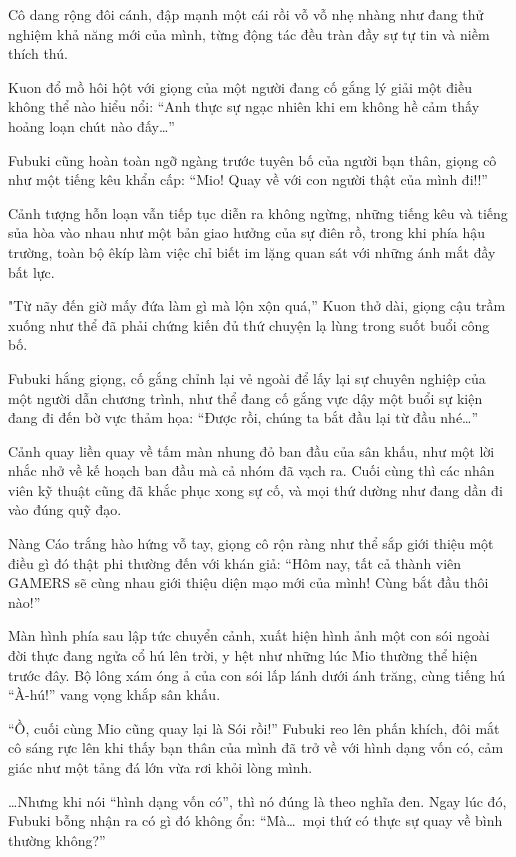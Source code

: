 \documentclass[../main.tex]{subfiles}
\begin{document}
Cô dang rộng đôi cánh, đập mạnh một cái rồi vỗ vỗ nhẹ nhàng như đang thử nghiệm khả năng mới của mình, từng động tác đều tràn đầy sự tự tin và niềm thích thú.

Kuon đổ mồ hôi hột với giọng của một người đang cố gắng lý giải một điều không thể nào hiểu nổi: ``Anh thực sự ngạc nhiên khi em không hề cảm thấy hoảng loạn chút nào đấy\dots''

Fubuki cũng hoàn toàn ngỡ ngàng trước tuyên bố của người bạn thân, giọng cô như một tiếng kêu khẩn cấp: ``Mio! Quay về với con người thật của mình đi!!''

Cảnh tượng hỗn loạn vẫn tiếp tục diễn ra không ngừng, những tiếng kêu và tiếng sủa hòa vào nhau như một bản giao hưởng của sự điên rồ, trong khi phía hậu trường, toàn bộ êkíp làm việc chỉ biết im lặng quan sát với những ánh mắt đầy bất lực.

\ct

"Từ nãy đến giờ mấy đứa làm gì mà lộn xộn quá,'' Kuon thở dài, giọng cậu trầm xuống như thể đã phải chứng kiến đủ thứ chuyện lạ lùng trong suốt buổi công bố.

Fubuki hắng giọng, cố gắng chỉnh lại vẻ ngoài để lấy lại sự chuyên nghiệp của một người dẫn chương trình, như thể đang cố gắng vực dậy một buổi sự kiện đang đi đến bờ vực thảm họa: ``Được rồi, chúng ta bắt đầu lại từ đầu nhé\dots''

Cảnh quay liền quay về tấm màn nhung đỏ ban đầu của sân khấu, như một lời nhắc nhở về kế hoạch ban đầu mà cả nhóm đã vạch ra. Cuối cùng thì các nhân viên kỹ thuật cũng đã khắc phục xong sự cố, và mọi thứ dường như đang dần đi vào đúng quỹ đạo.


Nàng Cáo trắng hào hứng vỗ tay, giọng cô rộn ràng như thể sắp giới thiệu một điều gì đó thật phi thường đến với khán giả: ``Hôm nay, tất cả thành viên GAMERS sẽ cùng nhau giới thiệu diện mạo mới của mình! Cùng bắt đầu thôi nào!''

Màn hình phía sau lập tức chuyển cảnh, xuất hiện hình ảnh một con sói ngoài đời thực đang ngửa cổ hú lên trời, y hệt như những lúc Mio thường thể hiện trước đây. Bộ lông xám óng ả của con sói lấp lánh dưới ánh trăng, cùng tiếng hú ``À-hú!'' vang vọng khắp sân khấu.

``Ồ, cuối cùng Mio cũng quay lại là Sói rồi!'' Fubuki reo lên phấn khích, đôi mắt cô sáng rực lên khi thấy bạn thân của mình đã trở về với hình dạng vốn có, cảm giác như một tảng đá lớn vừa rơi khỏi lòng mình.

\dots Nhưng khi nói ``hình dạng vốn có'', thì nó đúng là theo nghĩa đen. Ngay lúc đó, Fubuki bỗng nhận ra có gì đó không ổn: ``Mà\dots\ mọi thứ có thực sự quay về bình thường không?''
\end{document}
